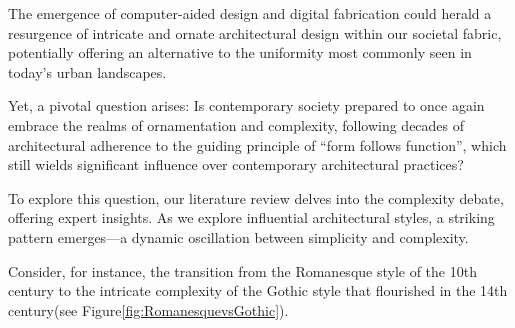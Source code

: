 


The emergence of computer-aided design and digital fabrication could herald a resurgence of intricate and ornate architectural design within our societal fabric, potentially offering an alternative to the uniformity most commonly seen in today's urban landscapes.

Yet, a pivotal question arises: Is contemporary society prepared to once again embrace the realms of ornamentation and complexity, following decades of architectural adherence to the guiding principle of ``form follows function''\cite{Gage2015}, which still wields significant influence over contemporary architectural practices?

To explore this question, our literature review delves into the complexity debate, offering expert insights.
As we explore influential architectural styles, a striking pattern emerges—a dynamic oscillation between simplicity and complexity.

Consider, for instance, the transition from the Romanesque style of the 10th century to the intricate complexity of the Gothic style that flourished in the 14th century\cite{Arora2023}(see Figure\ref{fig:RomanesquevsGothic}).

